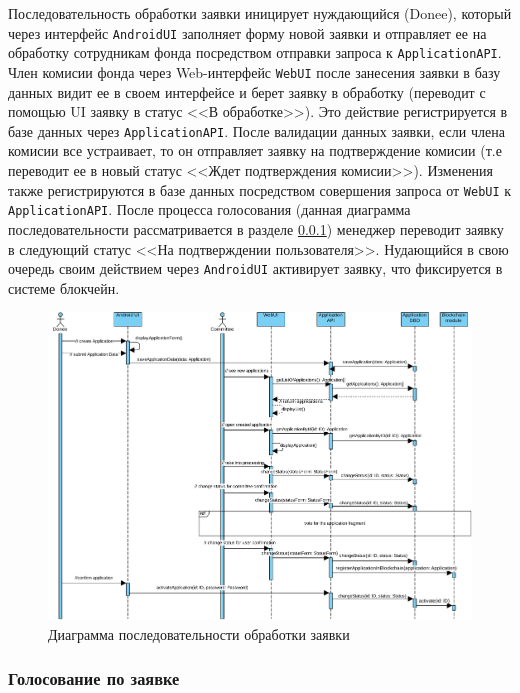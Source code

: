 \documentclass[a4paper,12pt,reqno]{article}
\begin{document}
Последовательность обработки заявки иницирует нуждающийся (Donee), который через интерфейс \texttt{AndroidUI} заполняет форму новой заявки и отправляет ее на обработку сотрудникам фонда посредством отправки запроса к \texttt{ApplicationAPI}. Член комисии фонда через Web-интерфейс \texttt{WebUI} после занесения заявки в базу данных видит ее в своем интерфейсе и берет заявку в обработку (переводит с помощью UI заявку в статус <<В обработке>>). Это действие регистрируется в базе данных через \texttt{ApplicationAPI}. После валидации данных заявки, если члена комисии все устраивает, то он отправляет заявку на подтверждение комисии (т.е переводит ее в новый статус <<Ждет подтверждения комисии>>). Изменения также регистрируются в базе данных посредством совершения запроса от \texttt{WebUI} к \texttt{ApplicationAPI}. После процесса голосования (данная диаграмма последовательности рассматривается в разделе \ref{sec: vote_seq}) менеджер переводит заявку в следующий статус <<На подтверждении пользователя>>. Нудающийся в свою очередь своим действием через \texttt{AndroidUI} активирует заявку, что фиксируется в системе блокчейн. 

\begin{figure}[H]
		\centering
		\includegraphics[width = \linewidth]{img/status_seq.pdf}
		\caption{Диаграмма последовательности обработки заявки}
		\label{pic: sequence_status}
\end{figure}


\subsubsection{Голосование по заявке} \label{sec: vote_seq}
\end{document}
